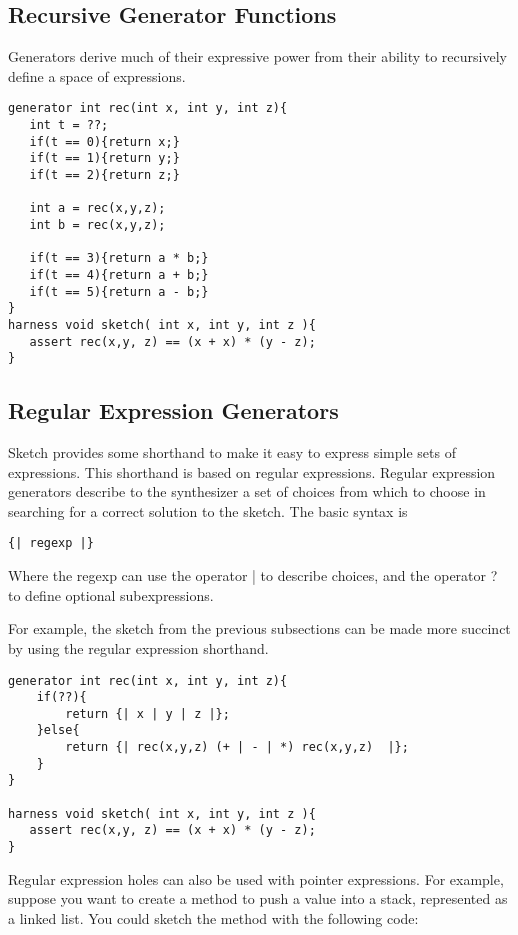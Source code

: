 \subsection{Recursive Generator Functions}

Generators derive much of their expressive power from their ability to recursively define a space of expressions. 


\begin{lstlisting}
generator int rec(int x, int y, int z){
   int t = ??;
   if(t == 0){return x;}   
   if(t == 1){return y;}
   if(t == 2){return z;}

   int a = rec(x,y,z);
   int b = rec(x,y,z);

   if(t == 3){return a * b;}
   if(t == 4){return a + b;} 
   if(t == 5){return a - b;}   
}
harness void sketch( int x, int y, int z ){
   assert rec(x,y, z) == (x + x) * (y - z);
}
\end{lstlisting}


\subsection{Regular Expression Generators}

Sketch provides some shorthand to make it easy to express simple sets of expressions. This shorthand is based on regular expressions. Regular expression generators describe to the synthesizer a set of choices from which to choose in searching for a correct solution to the sketch. The basic syntax is
\begin{lstlisting}
{| regexp |}
\end{lstlisting}

Where the regexp can use the operator | to describe choices, and the operator ? to define optional subexpressions.

For example, the sketch from the previous subsections can be made more succinct by using the regular expression shorthand. 

\begin{lstlisting}
generator int rec(int x, int y, int z){ 
    if(??){ 
        return {| x | y | z |};
    }else{
        return {| rec(x,y,z) (+ | - | *) rec(x,y,z)  |};
    }
}

harness void sketch( int x, int y, int z ){
   assert rec(x,y, z) == (x + x) * (y - z);
}
\end{lstlisting}


Regular expression holes can also be used with pointer expressions. For example, suppose you want to create a method to push a value into a stack, represented as a linked list. You could sketch the method with the following code:

